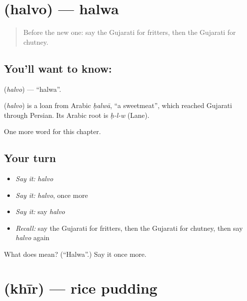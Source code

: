 \section[\texorpdfstring{\gu{હલવો} (halvo)}{હલવો (halvo)}]{ (halvo) — halwa}

\label{lesson:GU-C117-halvo}



\begin{quote}
Before the new one: say the Gujarati for fritters, then the Gujarati for chutney.
\end{quote}

\subsection*{You'll want to know: }
\textbf{} (\emph{halvo}) — \textquotedblleft{}halwa\textquotedblright{}.

\begin{cousinweb}
\textbf{} (\emph{halvo}) is a loan from Arabic \emph{ḥalwā}, \textquotedblleft{}a sweetmeat\textquotedblright{}, which reached Gujarati through Persian. Its Arabic root is \emph{ḥ-l-w} (Lane).
\end{cousinweb}

\begin{grammarlens}[title={What you've built}]
One more word for this chapter.
\end{grammarlens}

\subsection*{Your turn}
\begin{itemize}
\raggedright
  \item \emph{Say it:} \emph{halvo}
  \item \emph{Say it:} \emph{halvo}, once more
  \item \emph{Say it:} say \emph{halvo}
  \item \emph{Recall:} say the Gujarati for fritters, then the Gujarati for chutney, then say \emph{halvo} again
\end{itemize}

\begin{tcolorbox}[breakable,colback=teal!4,colframe=teal!35!black,title={Before you move on}]
What does  mean? (\textquotedblleft{}Halwa\textquotedblright{}.) Say it once more.
\end{tcolorbox}
\section[\texorpdfstring{\gu{ખીર} (khīr)}{ખીર (khīr)}]{ (khīr) — rice pudding}

